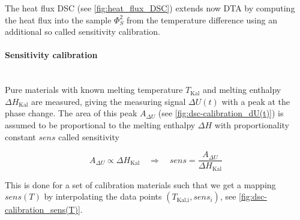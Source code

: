 \documentclass{scrartcl}[12pt, halfparskip]
\numberwithin{equation}{section}
\numberwithin{figure}{section}
\numberwithin{table}{section}
\begin{document}
The heat flux DSC (see \cref{fig:heat_flux_DSC}) extends now DTA by computing the heat flux into the sample $\varPhi_S^2$ from the temperature difference using an additional so called sensitivity calibration. 

\paragraph{Sensitivity calibration}\mbox{}\\
Pure materials with known melting temperature $T_{\text{Kal}}$ and melting enthalpy $\Delta H_{\text{Kal}}$ are measured, giving the measuring signal $\Delta U(t)$ with a peak at the phase change. 
The area of this peak $A_{\Delta U}$ (see \cref{fig:dsc-calibration_dU(t)}) is assumed to be proportional to the melting enthalpy $\Delta H$ with proportionality constant $sens$ called sensitivity

\begin{equation}
	A_{\Delta U} \propto \Delta H_{\text{Kal}} \quad \Rightarrow \quad sens = \frac{A_{\Delta U}}{\Delta H_{\text{Kal}}}
\end{equation} 

This is done for a set of calibration materials such that we get a mapping $sens(T)$ by interpolating the data points $(T_{\text{Kal,i}}, sens_i)$, see \cref{fig:dsc-calibration_sens(T)}.
\end{document}
